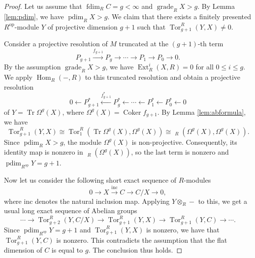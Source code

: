 \documentclass[a4paper,reqno]{amsart}
\numberwithin{equation}{section}
\theoremstyle{plain}
\theoremstyle{definition}
\theoremstyle{remark}
\DeclareMathOperator{\Hom}{Hom}
\DeclareMathOperator{\Ext}{Ext}
\DeclareMathOperator{\Tor}{Tor}
\DeclareMathOperator{\uHom}{\underline{Hom}}
\DeclareMathOperator{\uEnd}{\underline{End}}
\DeclareMathOperator{\Coker}{Coker}
\DeclareMathOperator{\grade}{grade}
\DeclareMathOperator{\pdim}{pdim}
\DeclareMathOperator{\fdim}{fdim}
\DeclareMathOperator{\op}{op}
\DeclareMathOperator{\Tr}{Tr}
\newcommand{\from}{\leftarrow}
\newcommand{\lto}{\longrightarrow}
\newcommand{\lfrom}{\longleftarrow}
\renewcommand{\-}{\mbox{-}}
\begin{document}
\begin{proof}
Let us assume that \(\fdim_RC=g<\infty\) and \(\grade_RX>g\).
By Lemma \ref{lem:pdim}, we have \(\pdim_RX>g\).
We claim that there exists a finitely presented \(R^{\op}\)-module \(Y\) of projective dimension \(g+1\) 
such that \(\Tor_{g+1}^R(Y,X) \neq 0\).

Consider a projective resolution of \(M\) truncated at the \((g+1)\)-th term
\begin{equation*}
    P_{g+1}\overset{f_{g+1}}\lto P_g\to \cdots\to P_1\to P_0\to 0.
\end{equation*}
By the assumption \(\grade_RX>g\), we have
\(\Ext^i_R(X,R)=0\) for all \(0\le i\le g\). 
We apply \(\Hom_R(-,R)\) to this truncated resolution and obtain a projective resolution 
\begin{equation*}
    0\from P_{g+1}^*\overset{f_{g+1}^*}\lfrom P_g^*\from\cdots\from P_1^*\from P_0^*\from 0
\end{equation*}
of \(Y =\Tr\Omega^g(X)\), where \(\Omega^{g}(X)=\Coker f_{g+1}\).
By Lemma \ref{lem:abformula}, we have 
\begin{equation*}
    \Tor_{g+1}^R(Y,X)
    \cong\Tor_1^R(\Tr\Omega^g(X),\Omega^g(X))
    \cong \uHom_R(\Omega^g(X),\Omega^g(X)).
\end{equation*} 
Since $\pdim_RX>g$,  the module $\Omega^g(X)$ is non-projective.
Consequently, its identity map is nonzero in
$\uEnd_R(\Omega^g(X))$, so the last term is nonzero and
$\pdim_{R^{\op}}Y=g+1$.


Now let us  consider the following short exact sequence
of \(R\)-modules
\begin{equation*}
    0 \to X \overset{\mathrm{inc}}\lto C \to C/X \to 0,
\end{equation*}
where \(\mathrm{inc}\) denotes the natural inclusion map.
Applying \(Y\otimes_R-\) to this, 
we get a usual long exact  sequence of Abelian groups
\begin{equation*}
    \cdots\to \Tor_{g+2}^R(Y,C/X)\to \Tor_{g+1}^R(Y,X)\to \Tor_{g+1}^R(Y,C)\to \cdots.
\end{equation*}
Since \(\pdim_{R^{\op}}{Y}=g+1\) and \(\Tor_{g+1}^R(Y,X)\) is nonzero, 
we have that \(\Tor_{g+1}^R(Y,C)\) is nonzero.
This  contradicts the assumption that the flat dimension of \(C\) is equal to \(g\).
The conclusion thus holds.
\end{proof}
\end{document}
